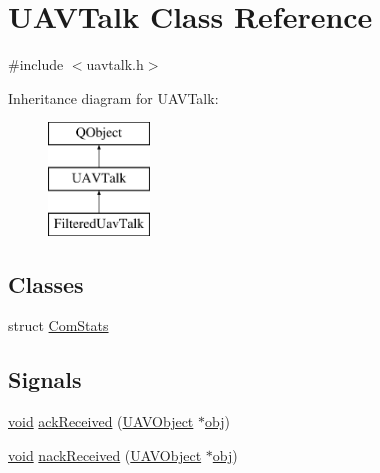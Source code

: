 \hypertarget{class_u_a_v_talk}{\section{U\-A\-V\-Talk Class Reference}
\label{class_u_a_v_talk}
}


{\ttfamily \#include $<$uavtalk.\-h$>$}

Inheritance diagram for U\-A\-V\-Talk\-:\begin{figure}[H]
\begin{center}
\leavevmode
\includegraphics[height=3.000000cm]{class_u_a_v_talk}
\end{center}
\end{figure}
\subsection*{Classes}
\begin{DoxyCompactItemize}
\item 
struct \hyperlink{struct_u_a_v_talk_1_1_com_stats}{Com\-Stats}
\end{DoxyCompactItemize}
\subsection*{Signals}
\begin{DoxyCompactItemize}
\item 
\hyperlink{group___u_a_v_objects_plugin_ga444cf2ff3f0ecbe028adce838d373f5c}{void} \hyperlink{group___u_a_v_talk_plugin_ga2d657cf81a725bce5e859eb6828cf80c}{ack\-Received} (\hyperlink{class_u_a_v_object}{U\-A\-V\-Object} $\ast$\hyperlink{glext_8h_a0c0d4701a6c89f4f7f0640715d27ab26}{obj})
\item 
\hyperlink{group___u_a_v_objects_plugin_ga444cf2ff3f0ecbe028adce838d373f5c}{void} \hyperlink{group___u_a_v_talk_plugin_gac0268d5005ed3241192bae731c362f7e}{nack\-Received} (\hyperlink{class_u_a_v_object}{U\-A\-V\-Object} $\ast$\hyperlink{glext_8h_a0c0d4701a6c89f4f7f0640715d27ab26}{obj})
\end{DoxyCompactItemize}
